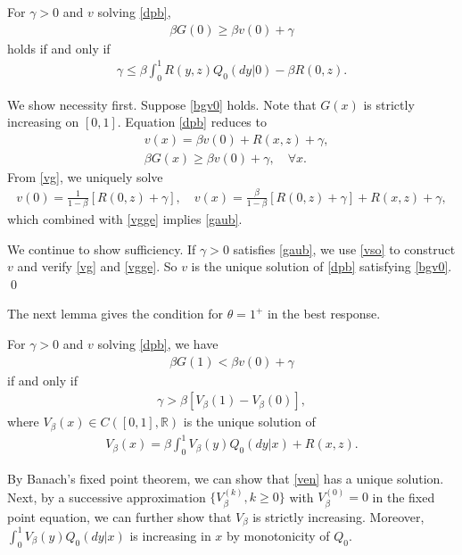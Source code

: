 \documentclass[graybox]{svmult}
\begin{document}
\begin{lemma}
For $\gamma>0$ and $v$ solving \eqref{dpb},
  \begin{align}
  \beta G(0)\ge \beta v(0)+\gamma \label{bgv0}
  \end{align}
  holds  if and only if
\begin{align}
\gamma\le \beta \int_0^1 R(y,z)Q_0(dy|0) - \beta R(0, z).\label{gaub}
\end{align}
\end{lemma}

\proof We show necessity first.
Suppose \eqref{bgv0} holds. Note that $G(x)$ is strictly increasing on $[0, 1]$.  Equation \eqref{dpb} reduces to
\begin{align}
&v(x)= \beta v(0)+R(x, z)+\gamma, \label{vg} \\
& \beta G(x)\ge \beta v(0) +\gamma,\quad  \forall x.  \label{vgge}
\end{align}
From \eqref{vg}, we uniquely solve
\begin{align}
v(0)= \frac{1}{1-\beta} [R(0,z)+\gamma], \quad v(x)=
\frac{\beta}{1-\beta} [R(0,z)+\gamma] +R(x, z)+\gamma, \label{vso}
\end{align}
which combined with \eqref{vgge} implies \eqref{gaub}.

We continue to show sufficiency. If $\gamma>0$ satisfies \eqref{gaub}, we use \eqref{vso} to construct $v$ and verify \eqref{vg} and \eqref{vgge}. So $v$ is the unique solution of \eqref{dpb} satisfying   \eqref{bgv0}.   \qed





The next lemma gives the condition for $\theta=1^+$
in the best response.

\begin{lemma}
For $\gamma >0$ and $v$ solving \eqref{dpb}, we have
\begin{align}
\beta G(1)< \beta v(0)+\gamma  \label{bg1v}
\end{align}
if and only if
\begin{align}
\gamma > \beta [V_\beta(1)-V_\beta(0)],  \label{glb}
\end{align}
where $V_\beta(x)\in C([0,1], \mathbb{R})$ is the unique solution of
\begin{align}  V_\beta(x)= \beta\int_0^1 V_\beta (y)Q_0(dy|x) +R(x,z). \label{ven}
\end{align}
\end{lemma}

\proof
By Banach's fixed point theorem, we can show that \eqref{ven} has a unique solution. Next, by a successive approximation $ \{V_\beta^{(k)}, k\ge 0 \}$ with $V_\beta^{(0)}=0$ in the fixed point equation, we can further show
that $V_\beta$ is strictly increasing. Moreover, $\int_0^1 V_\beta(y) Q_0(dy|x) $ is increasing in $x$ by monotonicity of $Q_0$.
\end{document}
